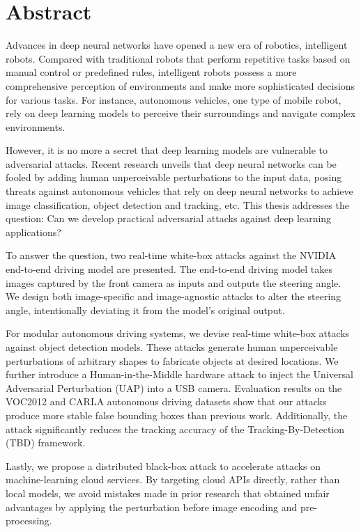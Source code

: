 \chapter*{Abstract}

Advances in deep neural networks have opened a new era of robotics, intelligent robots. Compared with traditional robots that perform repetitive tasks based on manual control or predefined rules, intelligent robots possess a more comprehensive perception of environments and make more sophisticated decisions for various tasks. For instance, autonomous vehicles, one type of mobile robot, rely on deep learning models to perceive their surroundings and navigate complex environments.

However, it is no more a secret that deep learning models are vulnerable to adversarial attacks. Recent research unveils that deep neural networks can be fooled by adding human unperceivable perturbations to the input data, posing threats against autonomous vehicles that rely on deep neural networks to achieve image classification, object detection and tracking, etc. This thesis addresses the question: Can we develop practical adversarial attacks against deep learning applications? 



To answer the question, two real-time white-box attacks against the NVIDIA end-to-end driving model are presented. The end-to-end driving model takes images captured by the front camera as inputs and outputs the steering angle. We design both image-specific and image-agnostic attacks to alter the steering angle, intentionally deviating it from the model’s original output.

For modular autonomous driving systems, we devise real-time white-box attacks against object detection models. These attacks generate human unperceivable perturbations of arbitrary shapes to fabricate objects at desired locations. We further introduce a Human-in-the-Middle hardware attack to inject the Universal Adversarial Perturbation (UAP) into a USB camera. Evaluation results on the VOC2012 and CARLA autonomous driving datasets show that our attacks produce more stable false bounding boxes than previous work. Additionally, the attack significantly reduces the tracking accuracy of the Tracking-By-Detection (TBD) framework.

Lastly, we propose a distributed black-box attack to accelerate attacks on machine-learning cloud services. By targeting cloud APIs directly, rather than local models, we avoid mistakes made in prior research that obtained unfair advantages by applying the perturbation before image encoding and pre-processing.
